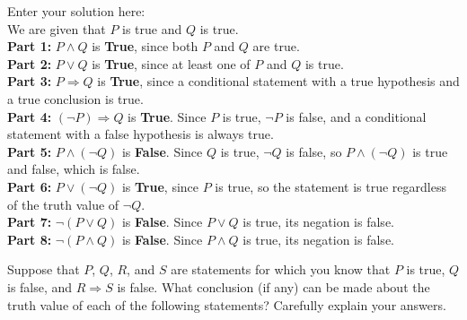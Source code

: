 \documentclass[10pt]{exam}
\begin{document}
\begin{questions}

\begin{solution}
Enter your solution here: \\
We are given that $P$ is true and $Q$ is true.\\

\textbf{Part 1:} $P \wedge Q$ is \textbf{True}, since both $P$ and $Q$ are true.\\

\textbf{Part 2:} $P \vee Q$ is \textbf{True}, since at least one of $P$ and $Q$ is true.\\

\textbf{Part 3:} $P \Rightarrow Q$ is \textbf{True}, since a conditional statement with a true hypothesis and a true conclusion is true.\\

\textbf{Part 4:} $(\neg P) \Rightarrow Q$ is \textbf{True}. Since $P$ is true, $\neg P$ is false, and a conditional statement with a false hypothesis is always true.\\

\textbf{Part 5:} $P \wedge (\neg Q)$ is \textbf{False}. Since $Q$ is true, $\neg Q$ is false, so $P \wedge (\neg Q)$ is true and false, which is false.\\

\textbf{Part 6:} $P \vee (\neg Q)$ is \textbf{True}, since $P$ is true, so the statement is true regardless of the truth value of $\neg Q$.\\

\textbf{Part 7:} $\neg (P \vee Q)$ is \textbf{False}. Since $P \vee Q$ is true, its negation is false.\\

\textbf{Part 8:} $\neg (P \wedge Q)$ is \textbf{False}. Since $P \wedge Q$ is true, its negation is false.
\end{solution}

\question Suppose that $P$, $Q$, $R$, and $S$ are statements for which you know that $P$ is true, $Q$ is false, and $R \Rightarrow S$ is false. What conclusion (if any) can be made about the truth value of each of the following statements? Carefully explain your answers.

\end{questions}
\end{document}
